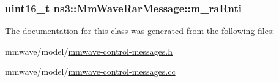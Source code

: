 \subsubsection[{\texorpdfstring{m\+\_\+ra\+Rnti}{m_raRnti}}]{\setlength{\rightskip}{0pt plus 5cm}uint16\+\_\+t ns3\+::\+Mm\+Wave\+Rar\+Message\+::m\+\_\+ra\+Rnti\hspace{0.3cm}{\ttfamily [private]}}\hypertarget{classns3_1_1MmWaveRarMessage_a1ec1c20683fbdd14c7a99f7679a40957}{}\label{classns3_1_1MmWaveRarMessage_a1ec1c20683fbdd14c7a99f7679a40957}


The documentation for this class was generated from the following files\+:\begin{DoxyCompactItemize}
\item 
mmwave/model/\hyperlink{mmwave-control-messages_8h}{mmwave-\/control-\/messages.\+h}\item 
mmwave/model/\hyperlink{mmwave-control-messages_8cc}{mmwave-\/control-\/messages.\+cc}\end{DoxyCompactItemize}
